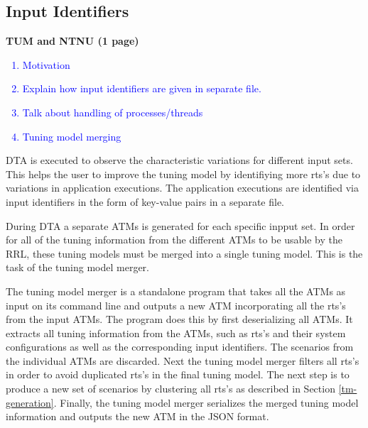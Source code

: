 \subsection{Input Identifiers} \label{sec:input}
\textbf{TUM and NTNU (1 page)}
\textcolor{blue}{
\begin{enumerate}
	\item Motivation
	\item Explain how input identifiers are given in separate file.
	\item Talk about handling of processes/threads
	\item Tuning model merging
\end{enumerate}}
DTA is executed to observe the characteristic variations for different input sets. This helps the user to improve the tuning model by identifiying more rts's due to variations in application executions. The application executions are identified via input identifiers in the form of key-value pairs in a separate file.

During DTA a separate ATMs is generated for each specific inpput set. In order for all of the tuning information from the different ATMs to be usable by the RRL, these tuning models must be merged into a single tuning model. This is the task of the tuning model merger.

The tuning model merger is a standalone program that takes all the ATMs as input on its command line and outputs a new ATM incorporating all the rts's from the input ATMs. The program does this by first deserializing all ATMs. It extracts all tuning information from the ATMs, such as rts's and their system configurations as well as the corresponding input identifiers. The scenarios from the individual ATMs are discarded. Next the tuning model merger filters all rts's in order to avoid duplicated rts's in the final tuning model. The next step is to produce a new set of scenarios by clustering all rts's as described in Section \ref{tm-generation}. Finally, the tuning model merger serializes the merged tuning model information and outputs the new ATM in the JSON format.
